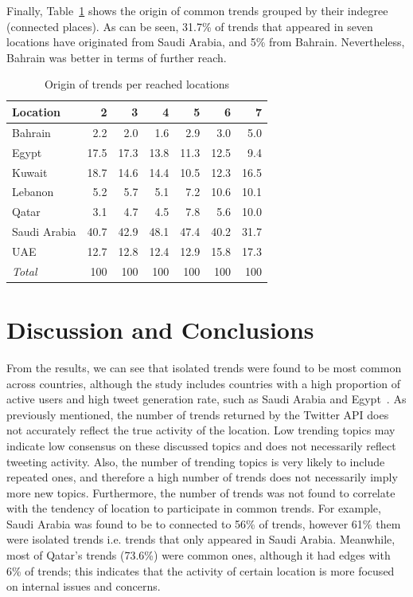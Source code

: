 \documentclass{llncs}
\begin{document}
Finally, Table~\ref{tbl:trendorigin} shows the origin of common trends
grouped by their indegree (connected places). As can be seen, 31.7\%
of trends that appeared in seven locations have originated from Saudi
Arabia, and 5\% from Bahrain. Nevertheless, Bahrain was better in
terms of further reach.

\begin{table}[!h]
\centering
\caption{Origin of trends per reached locations}
\begin{tabular}{@{}lrrrrrr@{}}
\toprule
Location & 2 & 3 & 4 & 5 & 6 & 7 \\ 
\midrule
Bahrain &           2.2 &   2.0 &   1.6 &   2.9 &   3.0 &    5.0 \\
Egypt &            17.5 & 17.3 & 13.8 & 11.3 & 12.5 &    9.4\\
Kuwait &          18.7 & 14.6  & 14.4 & 10.5 & 12.3 & 16.5\\
Lebanon &         5.2 &   5.7 &    5.1 &   7.2 & 10.6 & 10.1 \\
Qatar &              3.1 &   4.7 &    4.5 &   7.8 &   5.6 & 10.0 \\
Saudi Arabia & 40.7 & 42.9 &  48.1 & 47.4 & 40.2 & 31.7 \\
UAE &              12.7 & 12.8 &  12.4 & 12.9 & 15.8 & 17.3 \\
\midrule
{\emph{Total}} & 100 & 100 & 100 & 100 & 100 &  100 \\
\bottomrule
\end{tabular}
\label{tbl:trendorigin}
\end{table}

\vspace{-1em}
\section{Discussion and Conclusions}\label{dissconc}

From the results, we can see that isolated trends were found to be
most common across countries, although the study includes countries
with a high proportion of active users and high tweet generation rate,
such as Saudi Arabia and Egypt~\cite{Salem2017}. As previously
mentioned, the number of trends returned by the Twitter API does not
accurately reflect the true activity of the location. Low trending
topics may indicate low consensus on these discussed topics and does
not necessarily reflect tweeting activity. Also, the number of
trending topics is very likely to include repeated ones, and therefore
a high number of trends does not necessarily imply more new
topics. Furthermore, the number of trends was not found to correlate
with the tendency of location to participate in common trends. For
example, Saudi Arabia was found to be to connected to 56\% of trends,
however 61\% them were isolated trends i.e. trends that only appeared
in Saudi Arabia. Meanwhile, most of Qatar's trends (73.6\%) were
common ones, although it had edges with 6\% of trends; this indicates
that the activity of certain location is more focused on internal
issues and concerns.
\end{document}
